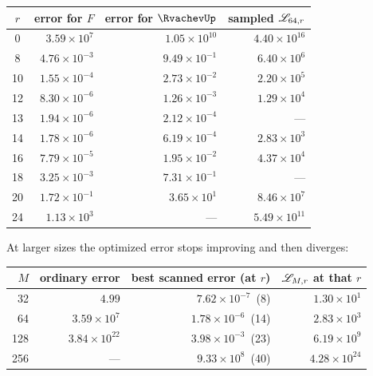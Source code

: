 \begin{center}
\small
\begin{tabular}{@{}crrr@{}}
\toprule
$r$ & error for $F$ & error for $\RvachevUp$ & sampled $\mathscr L_{64,r}$ \\
\midrule
0  & $3.59\times10^{7}$  & $1.05\times10^{10}$ & $4.40\times10^{16}$ \\
8  & $4.76\times10^{-3}$ & $9.49\times10^{-1}$ & $6.40\times10^{6}$ \\
10 & $1.55\times10^{-4}$ & $2.73\times10^{-2}$ & $2.20\times10^{5}$ \\
12 & $8.30\times10^{-6}$ & $1.26\times10^{-3}$ & $1.29\times10^{4}$ \\
13 & $1.94\times10^{-6}$ & $2.12\times10^{-4}$ & --- \\
14 & $1.78\times10^{-6}$ & $6.19\times10^{-4}$ & $2.83\times10^{3}$ \\
16 & $7.79\times10^{-5}$ & $1.95\times10^{-2}$ & $4.37\times10^{4}$ \\
18 & $3.25\times10^{-3}$ & $7.31\times10^{-1}$ & --- \\
20 & $1.72\times10^{-1}$ & $3.65\times10^{1}$  & $8.46\times10^{7}$ \\
24 & $1.13\times10^{3}$  & ---                 & $5.49\times10^{11}$ \\
\bottomrule
\end{tabular}
\label{tab:jet64}
\end{center}

At larger sizes the optimized error stops improving and then
diverges:
\begin{center}
\small
\begin{tabular}{rrrr}
\toprule
$M$ & ordinary error & best scanned error (at $r$) & $\mathscr L_{M,r}$ at that $r$ \\
\midrule
32  & $4.99$               & $7.62\times10^{-7}$\ (8)  & $1.30\times10^{1}$ \\
64  & $3.59\times10^{7}$   & $1.78\times10^{-6}$\ (14) & $2.83\times10^{3}$ \\
128 & $3.84\times10^{22}$  & $3.98\times10^{-3}$\ (23) & $6.19\times10^{9}$ \\
256 & ---                  & $9.33\times10^{8}$\ (40)  & $4.28\times10^{24}$ \\
\bottomrule
\end{tabular}
\label{tab:optimized}
\end{center}

